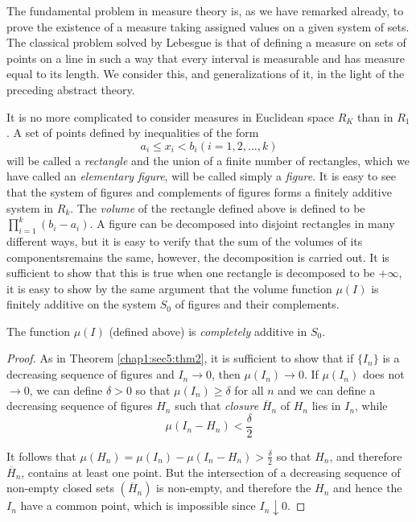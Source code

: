 The fundamental problem in measure theory is, as we have remarked
already, to prove the existence of a measure taking assigned values on
a given system of sets. The classical problem solved by Lebesgue is
that of defining a measure on sets of points on a line in such a way
that every interval is measurable and has measure equal to its
length. We consider this, and generalizations of it, in the light of
the preceding abstract theory. 

It is no more complicated to consider measures in Euclidean space
$R_K$ than in $R_1$. A set of points defined by inequalities of the
form 
$$ 
a_i \leq x_i < b_i (i = 1, 2, \ldots, k)
$$
will be called a {\em rectangle} and the union of a finite number of
rectangles, which we have called an {\em elementary figure}, will be
called simply a {\em figure}. It is easy to see that the system of
figures and complements of figures forms a finitely additive system in
$R_k$. The  {\em volume} of the rectangle defined above is defined to
be $\prod\limits^{k}_{i=1}(b_i -a_i)$. A figure can be decomposed
into disjoint rectangles in many different ways, but it is easy to
verify that the sum of the volumes of its  
components\pageoriginale remains the same, however, the decomposition is carried
out. It is sufficient to show that this is true when one rectangle is
decomposed to be $+ \infty$, it is easy to show by the same argument
that the volume function $\mu(I)$ is finitely additive on the system
$S_0$ of figures and their complements. 

\begin{theorem}\label{chap1:sec8:thm9}%
The function $\mu (I)$ (defined above) is {\em completely} additive in $S_0$.
\end{theorem}

\begin{proof}
  As in Theorem \ref{chap1:sec5:thm2}, it is sufficient to show that
  if $\{I_n\}$ is a 
  decreasing sequence of figures and $I_n \rightarrow 0$, then $\mu
  (I_n) \rightarrow 0$. If $\mu (I_n)$ does not $\rightarrow 0$, we can
  define $\delta > 0$ so that $\mu (I_n) \geq \delta$ for all $n$ and we
  can define a decreasing sequence of figures $H_n$ such that {\em
    closure} $\overline{H}_n$ of $H_n$ lies in $ I_n$, while  
  $$
  \mu (I_n - H_n) < \frac{\delta}{2}
  $$
  
  It follows that  $\mu (H_n)= \mu (I_n) - \mu (I_n - H_n)> \frac{\delta}{2}$
  so that $H_n$, and therefore $\overline{H}_n$, contains at least one
  point. But the intersection of a decreasing sequence of non-empty
  closed sets $(\overline{H}_n)$ is non-empty, and therefore the $H_n$
  and hence the $I_n$ have a common point, which is impossible since
  $I_n \downarrow 0$. 
\end{proof}

